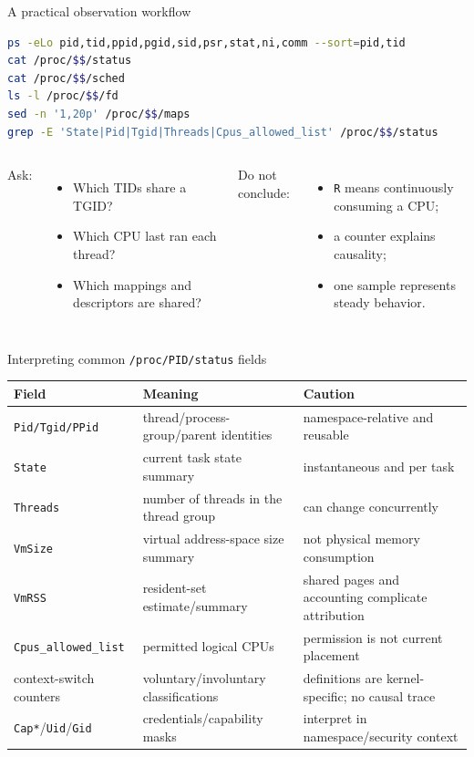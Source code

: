 \documentclass[aspectratio=169,11pt]{beamer}
\newcommand{\code}[1]{\texttt{#1}}
\begin{document}
\begin{frame}[fragile]{A practical observation workflow}
\begin{lstlisting}[language=bash]
ps -eLo pid,tid,ppid,pgid,sid,psr,stat,ni,comm --sort=pid,tid
cat /proc/$$/status
cat /proc/$$/sched
ls -l /proc/$$/fd
sed -n '1,20p' /proc/$$/maps
grep -E 'State|Pid|Tgid|Threads|Cpus_allowed_list' /proc/$$/status
\end{lstlisting}
  \begin{columns}[T,onlytextwidth]
      Ask:
      \begin{itemize}
        \item Which TIDs share a TGID?
        \item Which CPU last ran each thread?
        \item Which mappings and descriptors are shared?
      \end{itemize}
      Do not conclude:
      \begin{itemize}
        \item \code{R} means continuously consuming a CPU;
        \item a counter explains causality;
        \item one sample represents steady behavior.
      \end{itemize}
  \end{columns}
\end{frame}

\begin{frame}{Interpreting common \code{/proc/PID/status} fields}
  \small
  \begin{tabularx}{\textwidth}{@{}lXX@{}}
    \toprule
    \textbf{Field} & \textbf{Meaning} & \textbf{Caution} \\
    \midrule
    \code{Pid/Tgid/PPid} & thread/process-group/parent identities & namespace-relative and reusable \\
    \code{State} & current task state summary & instantaneous and per task \\
    \code{Threads} & number of threads in the thread group & can change concurrently \\
    \code{VmSize} & virtual address-space size summary & not physical memory consumption \\
    \code{VmRSS} & resident-set estimate/summary & shared pages and accounting complicate attribution \\
    \code{Cpus\_allowed\_list} & permitted logical CPUs & permission is not current placement \\
    context-switch counters & voluntary/involuntary classifications & definitions are kernel-specific; no causal trace \\
    \code{Cap*}/\code{Uid}/\code{Gid} & credentials/capability masks & interpret in namespace/security context \\
    \bottomrule
  \end{tabularx}
\end{frame}
\end{document}
